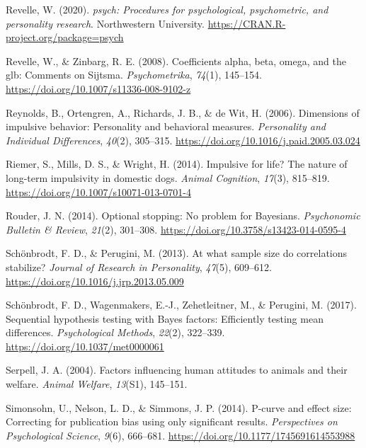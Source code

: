 \documentclass[
  pub,floatsintext]{apa6}
\newlength{\cslhangindent}
\newlength{\cslentryspacingunit} %
\newenvironment{CSLReferences}[2] %
 {%
  \setlength{\parindent}{0pt}
  \ifodd #1
  \let\oldpar\par
  \def\par{\hangindent=\cslhangindent\oldpar}
  \fi
  \setlength{\parskip}{#2\cslentryspacingunit}
 }%
 {}
\begin{document}
\begin{CSLReferences}{1}{0}
\leavevmode{}%
Revelle, W. (2020). \emph{{psych}: Procedures for psychological, psychometric, and personality research}. Northwestern University. \url{https://CRAN.R-project.org/package=psych}

\leavevmode{}%
Revelle, W., \& Zinbarg, R. E. (2008). Coefficients alpha, beta, omega, and the glb: {Comments} on {Sijtsma}. \emph{Psychometrika}, \emph{74}(1), 145--154. \url{https://doi.org/10.1007/s11336-008-9102-z}

\leavevmode{}%
Reynolds, B., Ortengren, A., Richards, J. B., \& de Wit, H. (2006). Dimensions of impulsive behavior: Personality and behavioral measures. \emph{Personality and Individual Differences}, \emph{40}(2), 305--315. \url{https://doi.org/10.1016/j.paid.2005.03.024}

\leavevmode{}%
Riemer, S., Mills, D. S., \& Wright, H. (2014). Impulsive for life? {The} nature of long-term impulsivity in domestic dogs. \emph{Animal Cognition}, \emph{17}(3), 815--819. \url{https://doi.org/10.1007/s10071-013-0701-4}

\leavevmode{}%
Rouder, J. N. (2014). Optional stopping: {No} problem for {Bayesians}. \emph{Psychonomic Bulletin \& Review}, \emph{21}(2), 301--308. \url{https://doi.org/10.3758/s13423-014-0595-4}

\leavevmode{}%
Schönbrodt, F. D., \& Perugini, M. (2013). At what sample size do correlations stabilize? \emph{Journal of Research in Personality}, \emph{47}(5), 609--612. \url{https://doi.org/10.1016/j.jrp.2013.05.009}

\leavevmode{}%
Schönbrodt, F. D., Wagenmakers, E.-J., Zehetleitner, M., \& Perugini, M. (2017). Sequential hypothesis testing with {Bayes} factors: {Efficiently} testing mean differences. \emph{Psychological Methods}, \emph{22}(2), 322--339. \url{https://doi.org/10.1037/met0000061}

\leavevmode{}%
Serpell, J. A. (2004). Factors influencing human attitudes to animals and their welfare. \emph{Animal Welfare}, \emph{13}(S1), 145--151.

\leavevmode{}%
Simonsohn, U., Nelson, L. D., \& Simmons, J. P. (2014). P-curve and effect size: {Correcting} for publication bias using only significant results. \emph{Perspectives on Psychological Science}, \emph{9}(6), 666--681. \url{https://doi.org/10.1177/1745691614553988}


\end{CSLReferences}
\end{document}
